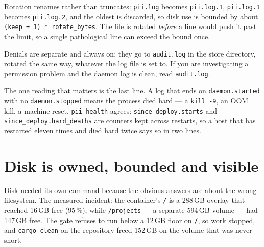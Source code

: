 Rotation renames rather than truncates: \texttt{pii.log} becomes \texttt{pii.log.1},
\texttt{pii.log.1} becomes \texttt{pii.log.2}, and the oldest is discarded, so disk use is
bounded by about \texttt{(keep + 1) * rotate\_bytes}. The file is rotated \emph{before} a
line would push it past the limit, so a single pathological line can exceed the bound once.

Denials are separate and always on: they go to \texttt{audit.log} in the store directory,
rotated the same way, whatever the log file is set to. If you are investigating a
permission problem and the daemon log is clean, read \texttt{audit.log}.

The one reading that matters is the last line. A log that ends on \texttt{daemon.started}
with no \texttt{daemon.stopped} means the process died hard --- a \texttt{kill -9}, an OOM
kill, a machine reset. \texttt{pii health} agrees: \texttt{since\_deploy.starts} and
\texttt{since\_deploy.hard\_deaths} are counters kept across restarts, so a host that has
restarted eleven times and died hard twice says so in two lines.

\section{Disk is owned, bounded and visible}

Disk needed its own command because the obvious answers are about the wrong filesystem. The
measured incident: the container's \texttt{/} is a 288\,GB overlay that reached 16\,GB
free (95\,\%), while \texttt{/projects} --- a separate 594\,GB volume --- had 147\,GB free.
The gate refuses to run below a 12\,GB floor on \texttt{/}, so work stopped, and
\texttt{cargo clean} on the repository freed 152\,GB on the volume that was never short.

\begin{center}
\end{center}

